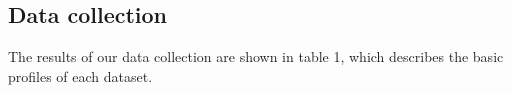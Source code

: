 \subsection{Data collection}
The results of our data collection are shown in table 1, which describes the basic profiles of each dataset. 









